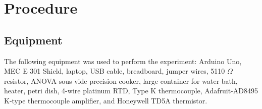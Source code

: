 \section{Procedure}

\subsection{Equipment}
\noindent The following equipment was used to perform the experiment: Arduino Uno, MEC E 301 Shield, laptop, USB cable, breadboard,
jumper wires, 5110 $\Omega$ resistor, ANOVA sous vide precision cooker, large container for water bath, heater, petri dish, 
4-wire platinum RTD, Type K thermocouple, Adafruit-AD8495 K-type thermocouple amplifier, and Honeywell TD5A thermistor.

